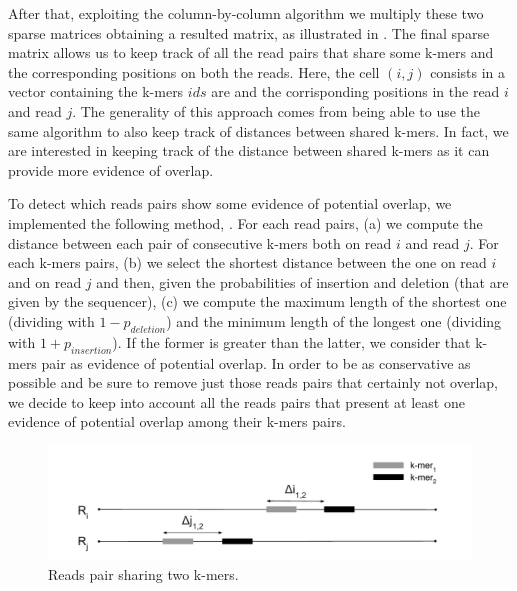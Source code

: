 \documentclass[11pt]{article}
\begin{document}
After that, exploiting the column-by-column algorithm we multiply these two sparse matrices obtaining a resulted matrix, as illustrated in .
The final sparse matrix allows us to keep track of all the read pairs that share some k-mers and the corresponding positions on both the reads.
Here, the cell $(i,j)$ consists in a vector containing the k-mers $ids$ are and the corrisponding positions in the read $i$ and read $j$. 
The generality of this approach comes from being able to use the same algorithm to also keep track of distances between shared k-mers. 
In fact, we are interested in keeping track of the distance between shared k-mers as it can provide more evidence of overlap.

To detect which reads pairs show some evidence of potential overlap, we implemented the following method, . 
For each read pairs, (a) we compute the distance between each pair of consecutive k-mers both on read $i$ and read $j$.
For each k-mers pairs, (b) we select the shortest distance between the one on read $i$ and on read $j$ and then, given the probabilities of insertion and deletion (that are given by the sequencer), (c) we compute the maximum length of the shortest one (dividing with $1-p_{deletion}$) and the minimum length of the longest one (dividing with $1+p_{insertion}$).
If the former is greater than the latter, we consider that k-mers pair as evidence of potential overlap.
In order to be as conservative as possible and be sure to remove just those reads pairs that certainly not overlap, we decide to keep into account all the reads pairs that present at least one evidence of potential overlap among their k-mers pairs.
\begin{figure}
    \centering
    \includegraphics[width=\textwidth]{image/detect.pdf}
    \caption{Reads pair sharing two k-mers.}
    \label{fig:detect}
\end{figure}
\end{document}
